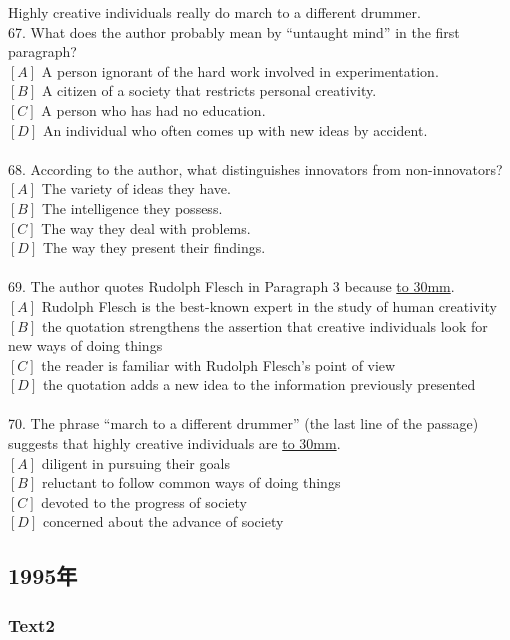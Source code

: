 \documentclass[a4paper]{article}
\begin{document}
\par
Highly creative individuals really do march to a different drummer.
\\67.	What does the author probably mean by “untaught mind” in the first paragraph?\\$[A]$ A person ignorant of the hard work involved in experimentation.\\$[B]$ A citizen of a society that restricts personal creativity.\\$[C]$ A person who has had no education.\\$[D]$ An individual who often comes up with new ideas by accident.\\\\68.	According to the author, what distinguishes innovators from non-innovators?\\$[A]$ The variety of ideas they have.\\$[B]$ The intelligence they possess.\\$[C]$ The way they deal with problems.\\$[D]$ The way they present their findings.\\\\69.	The author quotes Rudolph Flesch in Paragraph 3 because \underline{\hbox to 30mm{}}.\\$[A]$ Rudolph Flesch is the best-known expert in the study of human creativity\\$[B]$ the quotation strengthens the assertion that creative individuals look for new ways of doing things\\$[C]$ the reader is familiar with Rudolph Flesch’s point of view\\$[D]$ the quotation adds a new idea to the information previously presented\\\\70.	The phrase “march to a different drummer” (the last line of the passage) suggests that highly creative individuals are \underline{\hbox to 30mm{}}.\\$[A]$ diligent in pursuing their goals\\$[B]$ reluctant to follow common ways of doing things\\$[C]$ devoted to the progress of society\\$[D]$ concerned about the advance of society\\\subsection{1995年}
\subsubsection{Text2}
\end{document}
